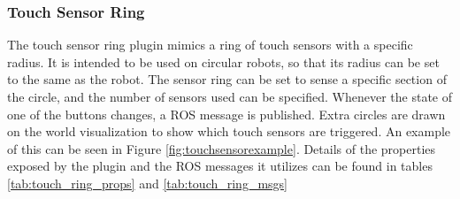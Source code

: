 \begin{itemize}
\subsubsection*{Touch Sensor Ring}
The touch sensor ring plugin mimics a ring of touch sensors with a specific radius. It is intended to be used on circular robots, so that its radius can be set to the same as the robot. 
	The sensor ring can be set to sense a specific section of the circle, and the number of sensors used can be specified. Whenever the state of one of the buttons changes, a ROS message is published. Extra circles are drawn on the world visualization to show which touch sensors are triggered. An example of this can be seen in Figure \ref{fig:touchsensorexample}. Details of the properties exposed by the plugin and the ROS messages it utilizes can be found in tables \ref{tab:touch_ring_props} and \ref{tab:touch_ring_msgs}
	

\end{itemize}
